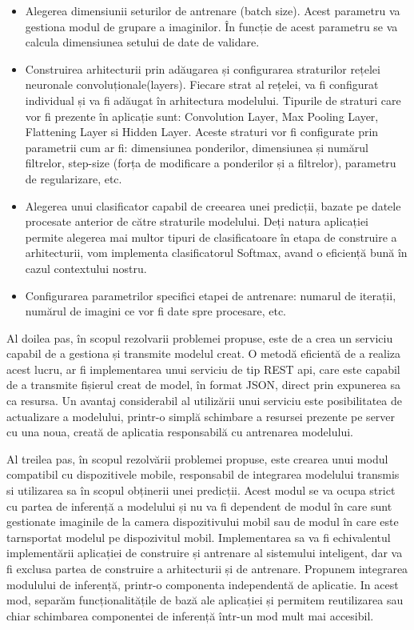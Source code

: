 	\begin{itemize}
	\item	Alegerea dimensiunii seturilor de antrenare (batch size). Acest parametru va gestiona modul de grupare a imaginilor. În funcție de acest parametru se va calcula dimensiunea setului de date de validare.
	
	
	\item	Construirea arhitecturii prin adăugarea și configurarea straturilor rețelei neuronale convoluționale(layers).  Fiecare strat al rețelei, va fi configurat individual și va fi adăugat în arhitectura modelului. Tipurile de straturi care vor fi prezente în aplicație sunt: Convolution Layer, Max Pooling Layer, Flattening Layer si Hidden Layer. Aceste straturi vor fi configurate prin parametrii cum ar fi: dimensiunea ponderilor, dimensiunea și numărul filtrelor, step-size (forța de modificare a ponderilor și a filtrelor), parametru de regularizare, etc.
	
	\item	Alegerea unui clasificator capabil de creearea unei predicții, bazate pe datele procesate anterior de către straturile modelului. Deți  natura aplicației permite alegerea mai multor tipuri de clasificatoare în etapa de construire a arhitecturii, vom implementa clasificatorul Softmax, avand o eficiență bună în cazul contextului nostru.
	
	\item	Configurarea parametrilor specifici etapei de antrenare: numarul de iterații, numărul de imagini ce vor fi date spre procesare, etc.
	
	\end{itemize}

	Al doilea pas, în scopul rezolvarii problemei propuse, este de a crea un serviciu capabil de a gestiona și transmite modelul creat. O metodă eficientă de a realiza acest lucru, ar fi implementarea unui serviciu de tip REST api, care este capabil de a transmite fișierul creat de model, în format JSON, direct prin expunerea sa ca resursa. 
	Un avantaj considerabil al utilizării unui serviciu este posibilitatea de actualizare a modelului, printr-o simplă schimbare a resursei prezente pe server cu una noua, creată de aplicatia responsabilă cu antrenarea modelului. 
	
	Al treilea pas, în scopul rezolvării problemei propuse, este crearea unui modul compatibil cu dispozitivele mobile, responsabil de integrarea modelului transmis si utilizarea sa în scopul obținerii unei predicții. 
	Acest modul se va ocupa strict cu partea de inferență a modelului și nu va fi dependent de modul în care sunt gestionate imaginile de la camera dispozitivului mobil sau de modul în care este tarnsportat modelul pe dispozivitul mobil. Implementarea sa va fi echivalentul implementării aplicației de construire și antrenare al sistemului inteligent, dar va fi exclusa partea de construire a arhitecturii și de antrenare. 
	Propunem integrarea modulului de inferență, printr-o componenta independentă de aplicatie. In acest mod, separăm funcționalitățile de bază ale aplicației și permitem reutilizarea sau chiar schimbarea componentei de inferență într-un mod mult mai accesibil.
	
